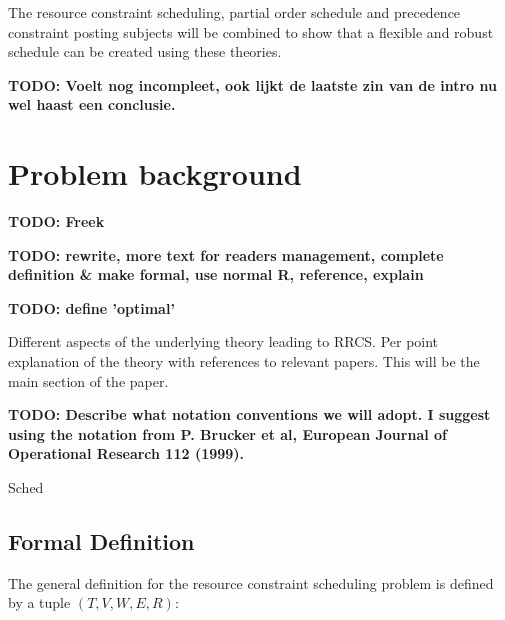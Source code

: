 \documentclass{article}
\newcommand{\TODO}[1]{{\color{red}\textbf{TODO: #1}}}
\begin{document}
The resource constraint scheduling, partial order schedule and precedence constraint posting subjects will be combined to show that a flexible and robust schedule can be created using these theories.

\TODO{Voelt nog incompleet, ook lijkt de laatste zin van de intro nu wel haast een conclusie.}

\newpage

\section{Problem background}
\TODO{Freek}

\TODO{rewrite, more text for readers management, complete definition \& make formal, use normal R, reference, explain}

\TODO{define 'optimal'}

Different aspects of the underlying theory leading to RRCS.
 Per point explanation of the theory with references to relevant papers.
This will be the main section of the paper.

\TODO{Describe what notation conventions we will adopt.
I suggest using the notation from P. Brucker et al, European Journal of Operational Research 112 (1999). }

Sched
\subsection{Formal Definition}
The general definition for the resource constraint scheduling problem is defined by a tuple $(T, V, W, E, R)$: \cite{brucker99}
\end{document}
